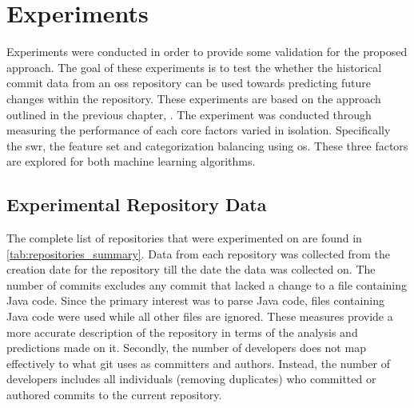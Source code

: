 \chapter{Experiments}
\label{chap:experiments}

Experiments were conducted in order to provide some validation for the proposed approach. The goal of these experiments is to test the whether the historical commit data from an \gls{oss} repository can be used towards predicting future changes within the repository. These experiments are based on the approach outlined in the previous chapter, . The experiment was conducted through measuring the performance of each core factors varied in isolation. Specifically the \gls{swr}, the feature set and categorization balancing using \gls{os}. These three factors are explored for both machine learning algorithms.

\section{Experimental Repository Data}
\label{sec:experimental_repository_data}



The complete list of repositories that were experimented on are found in \autoref{tab:repositories_summary}. Data from each repository was collected from the creation date for the repository till the date the data was collected on. The number of commits excludes any commit that lacked a change to a file containing Java code. Since the primary interest was to parse Java code, files containing Java code were used while all other files are ignored. These measures provide a more accurate description of the repository in terms of the analysis and predictions made on it. Secondly, the number of developers does not map effectively to what git uses as committers and authors. Instead, the number of developers includes all individuals (removing duplicates) who committed or authored commits to the current repository.

